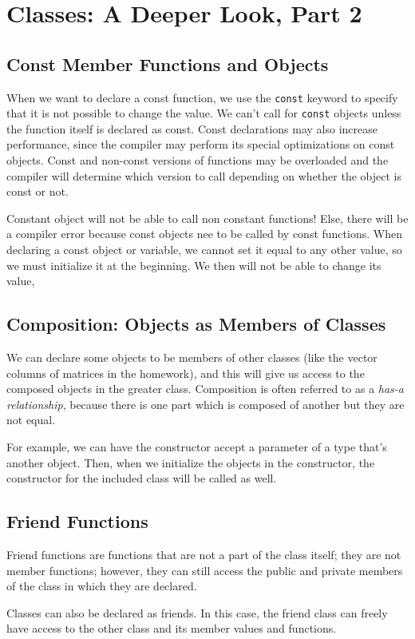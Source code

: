 \documentclass{article}
\begin{document}
\section{Classes: A Deeper Look, Part 2}
\subsection{Const Member Functions and Objects}
When we want to declare a const function, we use the \texttt{const} keyword to specify that it is not possible
to change the value. We can't call for \texttt{const} objects unless the function itself is declared as const. 
Const declarations may also increase performance, since the compiler may perform its special optimizations
on const objects. Const and non-const versions of functions may be overloaded and the compiler will determine
which version to call depending on whether the object is const or not.

Constant object will not be able to call non constant functions! Else, there will be a compiler error because 
const objects nee to be called by const functions. When declaring a const object or variable, we cannot 
set it equal to any other value, so we must initialize it at the beginning. We then will not be able to 
change its value,
\subsection{Composition: Objects as Members of Classes}

We can declare some objects to be members of other classes (like the vector columns of matrices in the homework),
and this will give us access to the composed objects in the greater class. Composition is often referred to as 
a \textit{has-a relationship}, because there is one part which is composed of another but they are not equal.

For example, we can have the constructor accept a parameter of a type that's another object. Then, when we 
initialize the objects in the constructor, the constructor for the included class will be called as well.
\subsection{Friend Functions}
Friend functions are functions that are not a part of the class itself; they are not member functions; however,
they can still access the public and private members of the class in which they are declared.

Classes can also be declared as friends. In this case, the friend class can freely have access to the other class
and its member values and functions.
\end{document}
